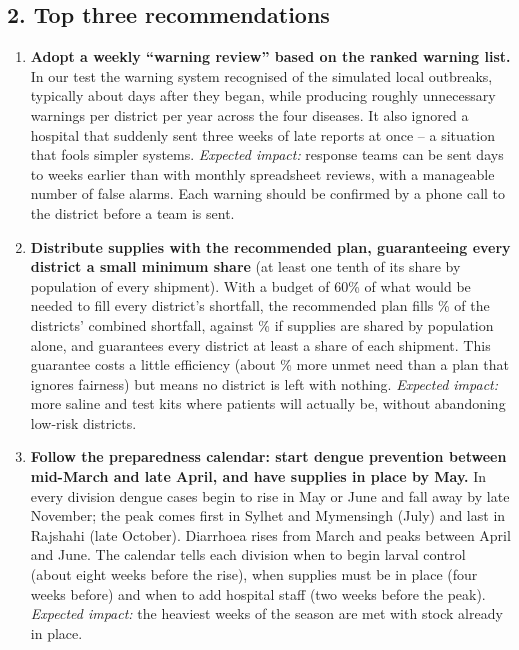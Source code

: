 \subsection*{2. Top three recommendations}
\begin{enumerate}
\item \textbf{Adopt a weekly ``warning review'' based on the ranked warning list.} In our test the warning system
recognised \SensLocal{} of the simulated local outbreaks, typically about \MedDelayLocal{} days after they began,
while producing roughly \FAperDY{} unnecessary warnings per district per year across the four diseases. It also
ignored a hospital that suddenly sent three weeks of late reports at once -- a situation that fools simpler systems.
\emph{Expected impact:} response teams can be sent days to weeks earlier than with monthly spreadsheet reviews,
with a manageable number of false alarms. Each warning should be confirmed by a phone call to the district
before a team is sent.
\item \textbf{Distribute supplies with the recommended plan, guaranteeing every district a small minimum
share} (at least one tenth of its share by population of every shipment). With a budget of 60\% of what would be needed to fill every district's shortfall, the
recommended plan fills \OptGapCov{}\% of the districts' combined shortfall, against \BaseGapCov{}\% if supplies
are shared by population alone, and guarantees every district at least a share of each shipment. This guarantee costs a little efficiency
(about \RecEffLoss{}\% more unmet need than a plan that ignores fairness) but means no district is left with
nothing. \emph{Expected impact:} more saline and test kits where patients will actually be, without abandoning
low-risk districts.
\item \textbf{Follow the preparedness calendar: start dengue prevention between mid-March and late April, and have
supplies in place by May.} In every division dengue cases begin to rise in May or June and fall away by late
November; the peak comes first in Sylhet and Mymensingh (July) and last in Rajshahi (late October). Diarrhoea
rises from March and peaks between April and June. The calendar tells each division when to begin larval control (about eight weeks before the rise),
when supplies must be in place (four weeks before) and when to add hospital staff (two weeks before the peak).
\emph{Expected impact:} the heaviest weeks of the season are met with stock already in place.
\end{enumerate}

